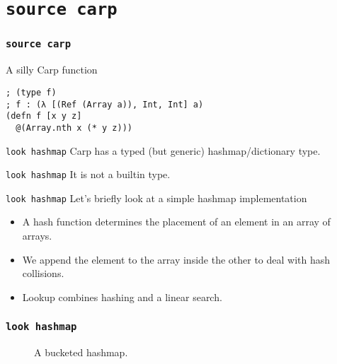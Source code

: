 \documentclass{beamer}
\begin{document}
  \section{\texttt{source carp}}
  \begin{frame}[fragile]
  \frametitle{\texttt{source carp}}
    \begin{listing}[H]
      \caption{A silly Carp function}
      \begin{verbatim}
; (type f)
; f : (λ [(Ref (Array a)), Int, Int] a)
(defn f [x y z]
  @(Array.nth x (* y z)))
      \end{verbatim}
    \end{listing}
  \end{frame}
  \begin{frame}{\texttt{look hashmap}}
      Carp has a typed (but generic) hashmap/dictionary type.
  \end{frame}
  \begin{frame}{\texttt{look hashmap}}
      It is not a builtin type.
  \end{frame}
  \begin{frame}{\texttt{look hashmap}}
      Let’s briefly look at a simple hashmap implementation
      \begin{itemize}
        \item A hash function determines the placement of an element in an array of arrays.
        \item We append the element to the array inside the other to deal with hash collisions.
        \item Lookup combines hashing and a linear search.
      \end{itemize}
  \end{frame}
  \begin{frame}[fragile]
  \frametitle{\texttt{look hashmap}}
    \begin{figure}
      \caption{A bucketed hashmap.}
    \end{figure}
  \end{frame}
\end{document}
